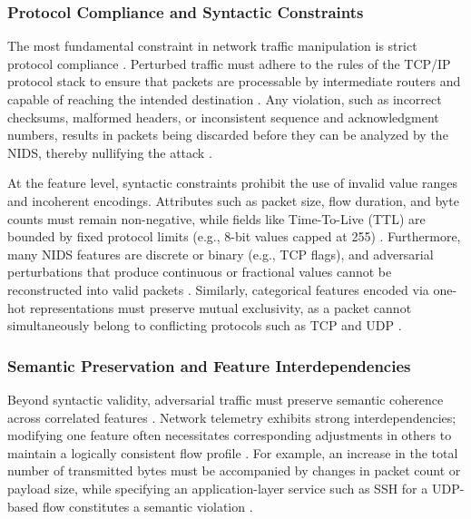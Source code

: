 \subsubsection{Protocol Compliance and Syntactic Constraints}

The most fundamental constraint in network traffic manipulation is strict protocol compliance \cite{abdelaty2021gadot}. 
Perturbed traffic must adhere to the rules of the TCP/IP protocol stack to ensure that packets are processable by intermediate routers and capable of reaching the intended destination \cite{wang2023evasion}. 
Any violation, such as incorrect checksums, malformed headers, or inconsistent sequence and acknowledgment numbers, results in packets being discarded before they can be analyzed by the NIDS, thereby nullifying the attack \cite{vitorino2023sok}.

At the feature level, syntactic constraints prohibit the use of invalid value ranges and incoherent encodings. 
Attributes such as packet size, flow duration, and byte counts must remain non-negative, while fields like Time-To-Live (TTL) are bounded by fixed protocol limits (e.g., 8-bit values capped at 255) \cite{merzouk2022investigating}. 
Furthermore, many NIDS features are discrete or binary (e.g., TCP flags), and adversarial perturbations that produce continuous or fractional values cannot be reconstructed into valid packets \cite{debicha2023adv}. 
Similarly, categorical features encoded via one-hot representations must preserve mutual exclusivity, as a packet cannot simultaneously belong to conflicting protocols such as TCP and UDP \cite{jiang2022fgmd}.

\subsubsection{Semantic Preservation and Feature Interdependencies}

Beyond syntactic validity, adversarial traffic must preserve semantic coherence across correlated features \cite{ennaji2025adversarial}. 
Network telemetry exhibits strong interdependencies; modifying one feature often necessitates corresponding adjustments in others to maintain a logically consistent flow profile \cite{he2023adversarial}. 
For example, an increase in the total number of transmitted bytes must be accompanied by changes in packet count or payload size, while specifying an application-layer service such as SSH for a UDP-based flow constitutes a semantic violation \cite{wang2024progen}.


